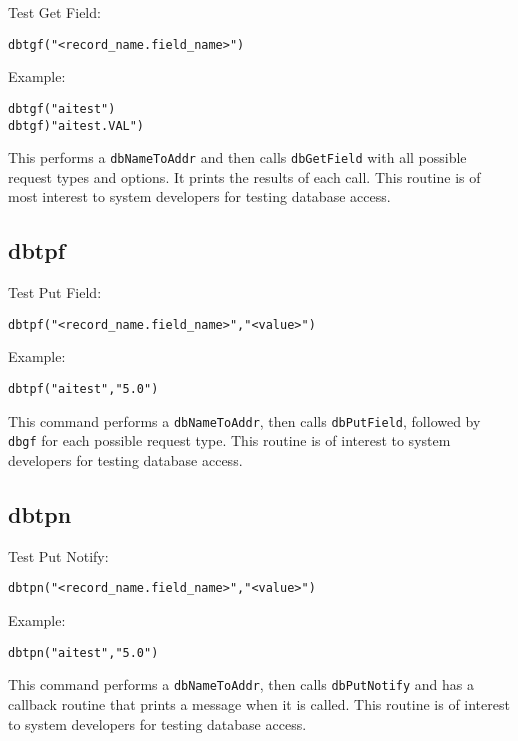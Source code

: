Test Get Field:

\begin{verbatim}
dbtgf("<record_name.field_name>")
\end{verbatim}

Example:

\begin{verbatim}
dbtgf("aitest")
dbtgf)"aitest.VAL")
\end{verbatim}

This performs a \verb|dbNameToAddr| and then calls \verb|dbGetField| with all possible request types and options. It prints the 
results of each call. This routine is of most interest to system developers for testing database access.

\subsection{dbtpf}

Test Put Field:

\begin{verbatim}
dbtpf("<record_name.field_name>","<value>")
\end{verbatim}

Example:

\begin{verbatim}
dbtpf("aitest","5.0")
\end{verbatim}

This command performs a \verb|dbNameToAddr|, then calls \verb|dbPutField|, followed by \verb|dbgf| for each possible request type. 
This routine is of interest to system developers for testing database access.

\subsection{dbtpn}

Test Put Notify:

\begin{verbatim}
dbtpn("<record_name.field_name>","<value>")
\end{verbatim}

Example:

\begin{verbatim}
dbtpn("aitest","5.0")
\end{verbatim}

This command performs a \verb|dbNameToAddr|, then calls \verb|dbPutNotify| and has a callback routine that prints a message 
when it is called. This routine is of interest to system developers for testing database access.

